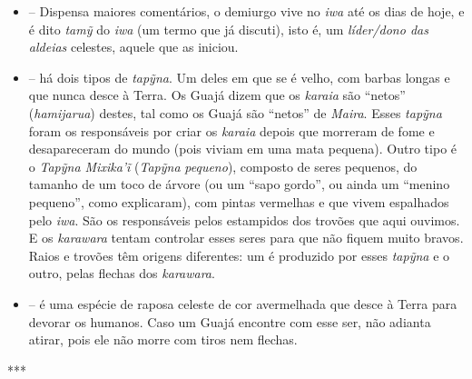 \begin{itemize}
\item
\emph{} -- Dispensa maiores comentários, o demiurgo vive no
\emph{iwa} até os dias de hoje, e é dito \emph{tamỹ} do \emph{iwa} (um
termo que já discuti), isto é, um \emph{líder/dono das aldeias}
celestes, aquele que as iniciou.
\item
\emph{} -- há dois tipos de \emph{tapỹna}. Um
deles em que se é velho, com barbas longas e que nunca desce à Terra. Os
Guajá dizem que os \emph{karaia} são ``netos'' (\emph{hamijarua}) destes,
tal como os Guajá são ``netos'' de \emph{Maira}. Esses
\emph{tapỹna} foram os responsáveis por criar os \emph{karaia}
depois que morreram de fome e desapareceram do mundo (pois viviam em uma
mata pequena). Outro tipo é o \emph{Tapỹna Mixika'ĩ}
(\emph{Tapỹna} \emph{pequeno}), composto de seres pequenos, do tamanho
de um toco de árvore (ou um ``sapo gordo'', ou ainda um ``menino pequeno'',
como explicaram), com pintas vermelhas e que vivem espalhados pelo
\emph{iwa}. São os responsáveis pelos estampidos dos trovões que aqui
ouvimos. E os \emph{karawara} tentam controlar esses seres para que não
fiquem muito bravos. Raios e trovões têm origens diferentes: um é
produzido por esses \emph{tapỹna} e o outro, pelas flechas dos
\emph{karawara}.
\item
\emph{} -- é uma espécie de raposa celeste de cor
avermelhada que desce à Terra para devorar os humanos. Caso um Guajá
encontre com esse ser, não adianta atirar, pois ele não morre com tiros
nem flechas.
\end{itemize}

\begin{center}
***
\end{center}

